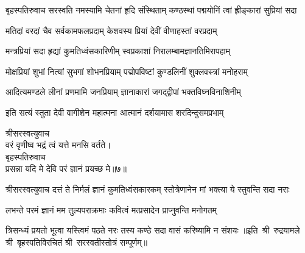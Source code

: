 
बृहस्पतिरुवाच
\twolineshloka
{सरस्वति नमस्यामि चेतनां हृदि संस्थिताम्}
{कण्ठस्थां पद्मयोनिं त्वां ह्रीङ्कारां सुप्रियां सदा}

\twolineshloka
{मतिदां वरदां चैव सर्वकामफलप्रदाम्}
{केशवस्य प्रियां देवीं वीणाहस्तां वरप्रदाम्}

\twolineshloka
{मन्त्रप्रियां सदा हृद्यां कुमतिध्वंसकारिणीम्}
{स्वप्रकाशां निरालम्बामज्ञानतिमिरापहाम्}

\twolineshloka
{मोक्षप्रियां शुभां नित्यां सुभगां शोभनप्रियाम्}
{पद्मोपविष्टां कुण्डलिनीं शुक्लवस्त्रां मनोहराम्}

\twolineshloka
{आदित्यमण्डले लीनां प्रणमामि जनप्रियाम्}
{ज्ञानाकारां जगद्द्वीपां भक्तविघ्नविनाशिनीम्}

\twolineshloka
{इति सत्यं स्तुता देवी वागीशेन महात्मना}
{आत्मानं दर्शयामास शरदिन्दुसमप्रभाम्}

श्रीसरस्वत्युवाच\\
वरं वृणीष्व भद्रं त्वं यत्ते मनसि वर्तते।\\
बृहस्पतिरुवाच\\
प्रसन्ना यदि मे देवि परं ज्ञानं प्रयच्छ मे॥७॥\\

श्रीसरस्वत्युवाच
\twolineshloka
{दत्तं ते निर्मलं ज्ञानं कुमतिध्वंसकारकम्}
{स्तोत्रेणानेन मां भक्त्या ये स्तुवन्ति सदा नराः}

\twolineshloka
{लभन्ते परमं ज्ञानं मम तुल्यपराक्रमाः}
{कवित्वं मत्प्रसादेन प्राप्नुवन्ति मनोगतम्}

\twolineshloka
{त्रिसन्ध्यं प्रयतो भूत्वा यस्त्विमं पठते नरः}
{तस्य कण्ठे सदा वासं करिष्यामि न संशयः}
॥इति~श्री~रुद्रयामले श्री~बृहस्पतिविरचितं श्री~सरस्वतीस्तोत्रं सम्पूर्णम्॥